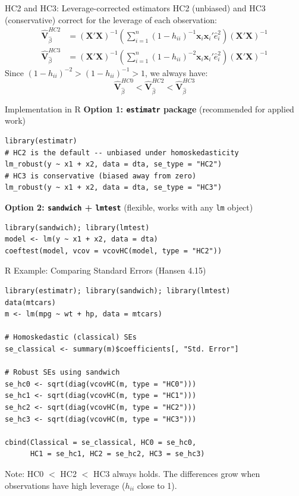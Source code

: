 \documentclass[aspectratio=169]{beamer}
\numberwithin{equation}{section}
\begin{document}
\begin{frame}{HC2 and HC3: Leverage-corrected estimators}
HC2 (unbiased) and HC3 (conservative) correct for the leverage of each observation:
\begin{align*}
\hat{\bm{V}}^{HC2}_{\hat{\beta}}&=(\bm{X'X})^{-1}\!\left(\sum_{i=1}^n (1-h_{ii})^{-1} \bm{x}_i\bm{x}_i'\hat{e}_i^2\right)\!(\bm{X'X})^{-1}\\[4pt]
\hat{\bm{V}}^{HC3}_{\hat{\beta}}&=(\bm{X'X})^{-1}\!\left(\sum_{i=1}^n (1-h_{ii})^{-2}\bm{x}_i\bm{x}_i'\hat{e}_i^2\right)\!(\bm{X'X})^{-1}
\end{align*}
\medskip
Since $(1-h_{ii})^{-2}>(1-h_{ii})^{-1}>1$, we always have:
$$\hat{\bm{V}}^{HC0}_{\hat{\beta}}< \hat{\bm{V}}^{HC2}_{\hat{\beta}}< \hat{\bm{V}}^{HC3}_{\hat{\beta}}$$
\end{frame}


\begin{frame}[fragile]{Implementation in R}
\textbf{Option 1: \texttt{estimatr} package} (recommended for applied work)
\begin{lstlisting}
library(estimatr)
# HC2 is the default -- unbiased under homoskedasticity
lm_robust(y ~ x1 + x2, data = dta, se_type = "HC2")
# HC3 is conservative (biased away from zero)
lm_robust(y ~ x1 + x2, data = dta, se_type = "HC3")
\end{lstlisting}\pause
\textbf{Option 2: \texttt{sandwich} + \texttt{lmtest}} (flexible, works with any \texttt{lm} object)
\begin{lstlisting}
library(sandwich); library(lmtest)
model <- lm(y ~ x1 + x2, data = dta)
coeftest(model, vcov = vcovHC(model, type = "HC2"))
\end{lstlisting}
\end{frame}

\begin{frame}[fragile]{R Example: Comparing Standard Errors (Hansen 4.15)}
\begin{lstlisting}
library(estimatr); library(sandwich); library(lmtest)
data(mtcars)
m <- lm(mpg ~ wt + hp, data = mtcars)

# Homoskedastic (classical) SEs
se_classical <- summary(m)$coefficients[, "Std. Error"]

# Robust SEs using sandwich
se_hc0 <- sqrt(diag(vcovHC(m, type = "HC0")))
se_hc1 <- sqrt(diag(vcovHC(m, type = "HC1")))
se_hc2 <- sqrt(diag(vcovHC(m, type = "HC2")))
se_hc3 <- sqrt(diag(vcovHC(m, type = "HC3")))

cbind(Classical = se_classical, HC0 = se_hc0,
      HC1 = se_hc1, HC2 = se_hc2, HC3 = se_hc3)
\end{lstlisting}
\medskip
Note: HC0 $<$ HC2 $<$ HC3 always holds.  The differences grow when observations have high leverage ($h_{ii}$ close to 1).
\end{frame}
\end{document}
